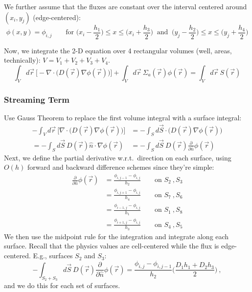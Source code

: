 \documentclass[12pt]{article}
\begin{document}
We further assume that the fluxes are constant over the interval centered around $(x_i, y_j)$ (edge-centered):
%
\[\phi(x,y) = \phi_{i,j} \qquad \text{for } \bigl(x_i - \frac{h_1}{2}\bigr) \leq x \leq \bigl(x_i + \frac{h_{3}}{2}\bigr) \:\text{ and }\:\bigl(y_j - \frac{h_2}{2}\bigr) \leq x \leq \bigl(y_j + \frac{h_{4}}{2}\bigr) \]

Now, we integrate the 2-D equation over 4 rectangular volumes (well, areas, technically): $V = V_1 + V_2 + V_3 + V_4$.
%
\[\int_V d\vec{r}\:\bigl[-\nabla \cdot \bigl(D(\vec{r})\nabla \phi(\vec{r})\bigr)\bigr] + \int_V d\vec{r}\:\Sigma_a(\vec{r}) \phi(\vec{r}) = \int_V d\vec{r}\:S(\vec{r})\]


\subsubsection{Streaming Term}
Use Gauss Theorem to replace the first volume integral with a surface integral:
%
\begin{align}
-\int_V d\vec{r}\:\bigl[\nabla \cdot \bigl(D(\vec{r})\nabla \phi(\vec{r})\bigr)\bigr] &= -\int_S d\vec{S} \cdot\bigl(D(\vec{r})\nabla \phi(\vec{r})\bigr) \nonumber \\
%
= -\int_S d\vec{S}\: D(\vec{r})\hat{n} \cdot \nabla \phi(\vec{r}) &= -\int_S d\vec{S} \:D(\vec{r})\frac{\partial}{\partial \hat{n}}\phi(\vec{r}) \nonumber
\end{align}
%
Next, we define the partial derivative w.r.t.\ direction on each surface, using $O(h)$ forward and backward difference schemes since they're simple:
\begin{align}
\frac{\partial}{\partial \hat{n}}\phi(\vec{r}) &= \frac{\phi_{i,j-1} - \phi_{i,j}}{h_2} \qquad \text{on } S_2 \:, S_3 \nonumber \\
%
&= \frac{\phi_{i,j+1} - \phi_{i,j}}{h_4} \qquad \text{on } S_7 \:, S_6 \nonumber \\
%
&= \frac{\phi_{i-1,j} - \phi_{i,j}}{h_1} \qquad \text{on } S_1 \:, S_8 \nonumber \\
%
&= \frac{\phi_{i+1,j} - \phi_{i,j}}{h_3} \qquad \text{on } S_4 \:, S_5 \nonumber 
\end{align}
%
We then use the midpoint rule for the integration and integrate along each surface. Recall that the physics values are cell-centered while the flux is edge-centered. E.g., surfaces $S_2$ and $S_3$:
%
\[-\int_{S_2+S_3} d\vec{S} \:D(\vec{r})\frac{\partial}{\partial \hat{n}}\phi(\vec{r}) = \boxed{\frac{\phi_{i,j} - \phi_{i,j-1}}{h_2} \biggl(\frac{D_1 h_1 + D_2 h_3}{2}\biggr)}\:,\]
%
and we do this for each set of surfaces. 
\end{document}
